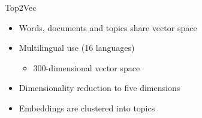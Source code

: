 \begin{frame}{Top2Vec}
    \begin{itemize}
        \item Words, documents and topics share vector space
        \item Multilingual \ac{use} (16 languages)
        \begin{itemize}
            \item 300-dimensional vector space
        \end{itemize}
        \item Dimensionality reduction to five dimensions
        \item Embeddings are clustered into topics
    \end{itemize}
\end{frame}